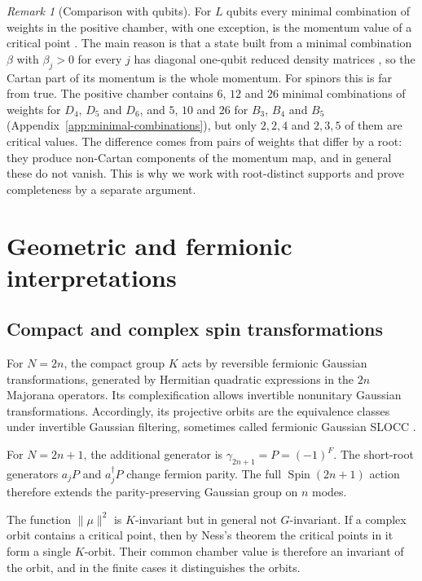 \documentclass{article}
\theoremstyle{definition}
\theoremstyle{remark}
\newtheorem{remark}[theorem]{Remark}
\newcommand{\Spin}{\operatorname{Spin}}
\newcommand{\norm}[1]{\lVert #1\rVert}
\begin{document}
\begin{remark}[Comparison with qubits]
\label{rem:qubit-comparison}
For $L$ qubits every minimal combination of weights in the positive chamber,
with one exception, is the momentum value of a critical point
\cite[Theorem~10]{MaciazekSawicki2015}. The main reason is that a state built
from a minimal combination $\beta$ with $\beta_j>0$ for every $j$ has diagonal
one-qubit reduced density matrices \cite[Lemma~9]{MaciazekSawicki2015}, so the
Cartan part of its momentum is the whole momentum. For spinors this is far from true. The
positive chamber contains $6$, $12$ and $26$ minimal combinations of weights
for $D_4$, $D_5$ and $D_6$, and $5$, $10$ and $26$ for $B_3$, $B_4$ and $B_5$
(Appendix~\ref{app:minimal-combinations}), but only $2,2,4$ and $2,3,5$ of them
are critical values. The difference
comes from pairs of weights that differ by a root: they produce non-Cartan
components of the momentum map, and in general these do not vanish. This is
why we work with root-distinct supports and prove completeness by a separate
argument.
\end{remark}

\section{Geometric and fermionic interpretations}
\label{sec:interpretation}

\subsection{Compact and complex spin transformations}

For $N=2n$, the compact group $K$ acts by reversible fermionic Gaussian
transformations, generated by Hermitian quadratic expressions in the
$2n$ Majorana operators. Its complexification allows invertible
nonunitary Gaussian transformations. Accordingly, its projective orbits
are the equivalence classes under invertible Gaussian filtering, sometimes
called fermionic Gaussian SLOCC \cite{SL2014}.

For $N=2n+1$, the additional generator is
$\gamma_{2n+1}=P=(-1)^F$. The short-root generators
$a_jP$ and $a_j^\dagger P$ change fermion parity. The full
$\Spin(2n+1)$ action therefore extends the parity-preserving Gaussian
group on $n$ modes.

The function $\norm\mu^2$ is $K$-invariant but in general not $G$-invariant.
If a complex orbit contains a critical point, then by Ness's theorem
the critical points in it form a single $K$-orbit. Their common chamber
value is therefore an invariant of the orbit, and in the finite cases it
distinguishes the orbits.
\end{document}
